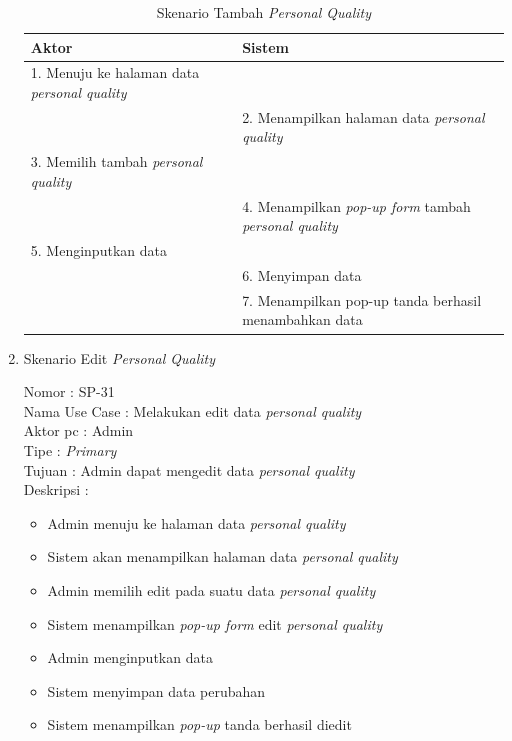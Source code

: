 \begin{enumerate}
\begin{itemize}
\end{itemize}

\begin{table}
	\caption{Skenario Tambah \textit{Personal Quality}}
	\centering
	\begin{tabular}{ | l | p{54.5mm} |}
		\hline 
		\textbf{Aktor} & \textbf{Sistem} \\
		\hline
		
		1.	Menuju ke halaman data \textit{personal quality} &  \\
		
		\hline
		
		&  2.	Menampilkan halaman data \textit{personal quality} \\
		
		\hline
		
		3. Memilih tambah \textit{personal quality} & \\
		
		\hline
		
		& 4.	Menampilkan\textit{ pop-up form} tambah \textit{personal quality} \\
		
		\hline
		
		5.	Menginputkan data  & \\
		\hline
		
		& 6.	Menyimpan data \\
		\hline
		
		& 7.	Menampilkan pop-up tanda berhasil menambahkan data \\
		\hline
		
	\end{tabular}
\end{table}

\item Skenario Edit\textit{ Personal Quality}

Nomor \kern 3.6pc : SP-31 \\
Nama Use Case : Melakukan edit data \textit{personal quality} \\
Aktor  pc : Admin \\
Tipe \kern 4.6pc : \textit{Primary} \\
Tujuan \kern 3.6pc : Admin dapat mengedit data \textit{personal quality} \\
Deskripsi \kern 2.5pc : 

\begin{itemize}
	\item Admin menuju ke halaman data \textit{personal quality}
	\item Sistem akan menampilkan halaman data\textit{ personal quality}
	\item Admin memilih edit pada suatu data \textit{personal quality}
	\item Sistem menampilkan \textit{pop-up form} edit \textit{personal quality}
	\item Admin menginputkan data
	\item Sistem menyimpan data perubahan
	\item Sistem menampilkan\textit{ pop-up }tanda berhasil diedit
	

\end{itemize}
\end{enumerate}
